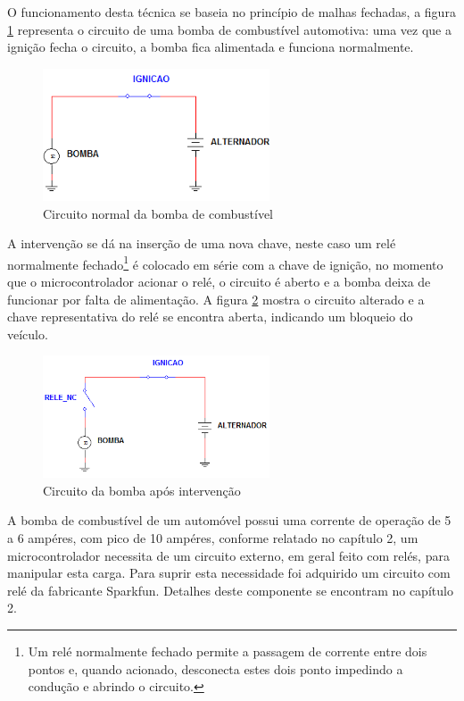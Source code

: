 O funcionamento desta técnica se baseia no princípio de malhas fechadas, a figura \ref{fig:circbombnorm} representa o circuito de uma bomba de combustível automotiva: uma vez que a ignição fecha o circuito, a bomba fica alimentada e funciona normalmente.

 \begin{figure}[!htb]
\centering
\includegraphics[width=0.6\textwidth]{figures/circBomba.png}
\caption{Circuito normal da bomba de combustível}
\label{fig:circbombnorm}
\end{figure}

A intervenção se dá na inserção de uma nova chave, neste caso um relé normalmente fechado\footnote{Um relé normalmente fechado permite a passagem de corrente entre dois pontos e, quando acionado, desconecta estes dois ponto impedindo a condução e abrindo o circuito.} é colocado em série com a chave de ignição, no momento que o microcontrolador acionar o relé, o circuito é aberto e a bomba deixa de funcionar por falta de alimentação. A figura \ref{fig:circbombinterv} mostra o circuito alterado e a chave representativa do relé se encontra aberta, indicando um bloqueio do veículo.

\begin{figure}[!htb]
\centering
\includegraphics[width=0.6\textwidth]{figures/circBombaFin.png}
\caption{Circuito da bomba após intervenção}
\label{fig:circbombinterv}
\end{figure}

A bomba de combustível de um automóvel possui uma corrente de operação de 5 a 6 ampéres, com pico de 10 ampéres, conforme relatado no capítulo 2, um microcontrolador necessita de um circuito externo, em geral feito com relés, para manipular esta carga. Para suprir esta necessidade foi adquirido um circuito com relé da fabricante Sparkfun. Detalhes deste componente se encontram no capítulo 2.

